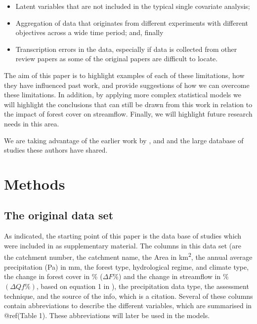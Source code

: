 \documentclass[]{elsarticle} %
\providecommand{\tightlist}{%
  \setlength{\itemsep}{0pt}\setlength{\parskip}{0pt}}
\begin{document}
\begin{itemize}
\tightlist
\item
  Latent variables that are not included in the typical single covariate analysis;\\
\item
  Aggregation of data that originates from different experiments with different objectives across a wide time period; and, finally\\
\item
  Transcription errors in the data, especially if data is collected from other review papers as some of the original papers are difficult to locate.
\end{itemize}

The aim of this paper is to highlight examples of each of these limitations, how they have influenced past work, and provide suggestions of how we can overcome these limitations. In addition, by applying more complex statistical models we will highlight the conclusions that can still be drawn from this work in relation to the impact of forest cover on streamflow. Finally, we will highlight future research needs in this area.

We are taking advantage of the earlier work by \citet{zhang2017}, \citet{filoso2017} and \citet{zhou2015} and the large database of studies these authors have shared.

\hypertarget{methods}{%
\section{Methods}\label{methods}}

\hypertarget{the-original-data-set}{%
\subsection{The original data set}\label{the-original-data-set}}

As indicated, the starting point of this paper is the data base of studies which were included in \citet{zhang2017} as supplementary material. The columns in this data set (are the catchment number, the catchment name, the Area in km\textsuperscript{2}, the annual average precipitation (Pa) in mm, the forest type, hydrological regime, and climate type, the change in forest cover in \% (\(\Delta F\%\)) and the change in streamflow in \% \((\Delta Qf\%)\), based on equation 1 in \citet{zhang2017}), the precipitation data type, the assessment technique, and the source of the info, which is a citation.
Several of these columns contain abbreviations to describe the different variables, which are summarised in @ref(Table 1). These abbreviations will later be used in the models.
\end{document}
